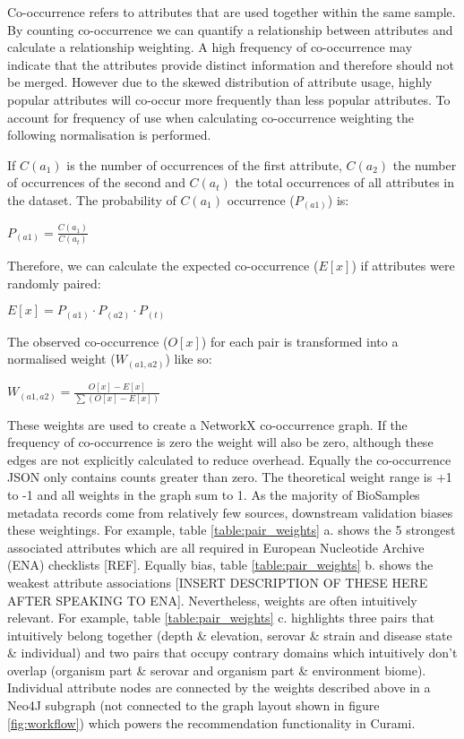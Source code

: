 \documentclass{bmcart}
\begin{document}
Co-occurrence refers to attributes that are used together within the same sample. By counting co-occurrence we can quantify a relationship between attributes and calculate a relationship weighting. A high frequency of co-occurrence may indicate that the attributes provide distinct information and therefore should not be merged. However due to the skewed distribution of attribute usage, highly popular attributes will co-occur more frequently than less popular attributes. To account for frequency of use when calculating co-occurrence weighting the following normalisation is performed.


If $C(a_{1})$ is the number of occurrences of the first attribute, $C(a_{2})$ the number of occurrences of the second and $C(a_{t})$ the total occurrences of all attributes in the dataset. The probability of $C(a_{1})$ occurrence ($P_{(a1)}$) is:

$\displaystyle P_{(a1)} = \frac{C(a_{1})}{C(a_{t})}$

Therefore, we can calculate the expected co-occurrence ($E[x]$) if attributes were randomly paired:

$\displaystyle E[x] = P_{(a1)} \cdot P_{(a2)} \cdot P_{(t)}$

The observed co-occurrence ($O[x]$) for each pair is transformed into a normalised weight ($W_{(a1, a2)}$) like so:

$\displaystyle W_{(a1, a2)} = \frac{O[x] - E[x]}{\sum (O[x] - E[x])}$

These weights are used to create a NetworkX co-occurrence graph. If the frequency of co-occurrence is zero the weight will also be zero, although these edges are not explicitly calculated to reduce overhead. Equally the co-occurrence JSON only contains counts greater than zero. The theoretical weight range is +1 to -1 and all weights in the graph sum to 1. As the majority of BioSamples metadata records come from relatively few sources, downstream validation biases these weightings. For example, table \ref{table:pair_weights} a. shows the 5 strongest associated attributes which are all required in European Nucleotide Archive (ENA) checklists [REF]. Equally bias, table \ref{table:pair_weights} b. shows the weakest attribute associations [INSERT DESCRIPTION OF THESE HERE AFTER SPEAKING TO ENA]. Nevertheless, weights are often intuitively relevant. For example, table \ref{table:pair_weights} c. highlights three pairs that intuitively belong together (depth \& elevation, serovar \& strain and disease state \& individual) and two pairs that occupy contrary domains which intuitively don't overlap (organism part \& serovar and organism part \& environment biome). Individual attribute nodes are connected by the weights described above in a Neo4J subgraph (not connected to the graph layout shown in figure \ref{fig:workflow}) which powers the recommendation functionality in Curami.
\end{document}
